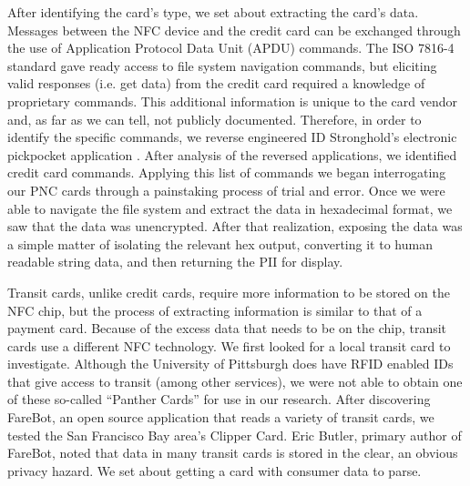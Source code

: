 \documentclass{IEEEtran}
\begin{document}
After identifying the card's type, we set about extracting the card's data. Messages between the NFC device and the credit card can be exchanged through the use of Application Protocol Data Unit (APDU) commands. The ISO 7816-4 standard gave ready access to file system navigation commands, but eliciting valid responses (i.e. get data) from the credit card required a knowledge of proprietary commands. This additional information is unique to the card vendor and, as far as we can tell, not publicly documented. Therefore, in order to identify the specific commands, we reverse engineered ID Stronghold's electronic pickpocket application \cite{idstronghold-1}. After analysis of the reversed applications, we identified credit card commands.  Applying this list of commands we began interrogating our PNC cards through a painstaking process of trial and error.  Once we were able to navigate the file system and extract the data in hexadecimal format, we saw that the data was unencrypted.  After that realization, exposing the data was a simple matter of isolating the relevant hex output, converting it to human readable string data, and then returning the PII for display.     

Transit cards, unlike credit cards, require more information to be stored on the NFC chip, but the process of extracting information is similar to that of a payment card.  Because of the excess data that needs to be on the chip, transit cards use a different NFC technology.  We first looked for a local transit card to investigate.  Although the University of Pittsburgh does have RFID enabled IDs that give access to transit (among other services), \cite{pittcard-1} we were not able to obtain one of these so-called ``Panther Cards'' for use in our research.  After discovering FareBot, an open source application \cite{farebot-1} that reads a variety of transit cards, we tested the San Francisco Bay area's Clipper Card.  Eric Butler, primary author of FareBot, noted that data in many transit cards is stored in the clear, an obvious privacy hazard.  We set about getting a card with consumer data to parse.  
\end{document}
